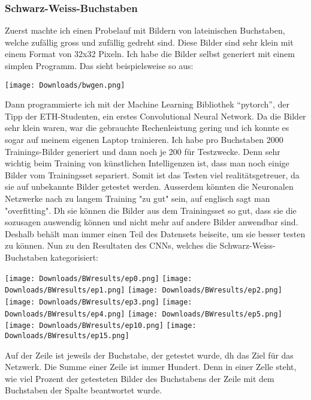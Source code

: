 \documentclass[10pt,a4paper,ngerman,english]{article}
\begin{document}
\subsubsection{Schwarz-Weiss-Buchstaben}

Zuerst machte ich einen Probelauf mit Bildern von lateinischen Buchstaben, welche zufällig gross und zufällig gedreht sind. Diese Bilder sind sehr klein mit einem Format von 32x32 Pixeln. Ich habe die Bilder selbst generiert mit einem simplen Programm. Das sieht beispielsweise so aus:

\begin{center}
    \texttt{[image: Downloads/bwgen.png]}
\end{center}

Dann programmierte ich mit der Machine Learning Bibliothek \enquote{pytorch}, der Tipp der ETH-Studenten, ein erstes Convolutional Neural Network. Da die Bilder sehr klein waren, war die gebrauchte Rechenleistung gering und ich konnte es sogar auf meinem eigenen Laptop trainieren. Ich habe pro Buchstaben 2000 Trainings-Bilder generiert und dann noch je 200 für Testzwecke. Denn sehr wichtig beim Training von künstlichen Intelligenzen ist, dass man noch einige Bilder vom Trainingsset separiert. Somit ist das Testen viel realitätsgetreuer, da sie auf unbekannte Bilder getestet werden. Ausserdem könnten die Neuronalen Netzwerke nach zu langem Training "zu gut" sein, auf englisch sagt man "overfitting". Dh sie können die Bilder aus dem Trainingsset so gut, dass sie die sozusagen auswendig können und nicht mehr auf andere Bilder anwendbar sind. Deshalb behält man immer einen Teil des Datensets beiseite, um sie besser testen zu können. Nun zu den Resultaten des CNNs, welches die Schwarz-Weiss-Buchstaben kategorisiert:

\begin{center}
    \texttt{[image: Downloads/BWresults/ep0.png]}
    \texttt{[image: Downloads/BWresults/ep1.png]}
    \texttt{[image: Downloads/BWresults/ep2.png]}
    \texttt{[image: Downloads/BWresults/ep3.png]}
    \texttt{[image: Downloads/BWresults/ep4.png]}
    \texttt{[image: Downloads/BWresults/ep5.png]}
    \texttt{[image: Downloads/BWresults/ep10.png]}
    \texttt{[image: Downloads/BWresults/ep15.png]}
\end{center}

Auf der Zeile ist jeweils der Buchstabe, der getestet wurde, dh das Ziel für das Netzwerk. Die Summe einer Zeile ist immer Hundert. Denn in einer Zelle steht, wie viel Prozent der getesteten Bilder des Buchstabens der Zeile mit dem Buchstaben der Spalte beantwortet wurde. 
\end{document}
